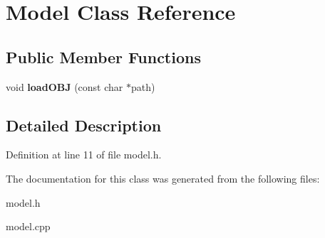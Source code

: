 \hypertarget{classModel}{}\section{Model Class Reference}
\label{classModel}
\subsection*{Public Member Functions}
\begin{DoxyCompactItemize}
\item 
void {\bfseries load\+O\+BJ} (const char $\ast$path)\hypertarget{classModel_aea5458c70df4bf176fee7bd37ead2a9b}{}\label{classModel_aea5458c70df4bf176fee7bd37ead2a9b}

\end{DoxyCompactItemize}


\subsection{Detailed Description}


Definition at line 11 of file model.\+h.



The documentation for this class was generated from the following files\+:\begin{DoxyCompactItemize}
\item 
model.\+h\item 
model.\+cpp\end{DoxyCompactItemize}
